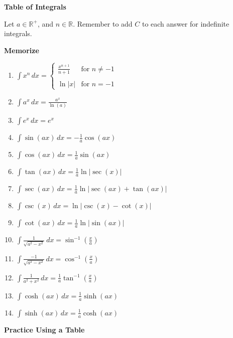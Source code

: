 \documentclass[11pt]{article}
\begin{document}
\begin{center}\textbf{\Huge Table of Integrals }\end{center}
Let $a \in \mathbb{R}^{+}$, and $n \in \mathbb{R}$. Remember to add $C$ to each answer for indefinite integrals.
\begin{center}
\textbf{\large Memorize}
\end{center}
\begin{multicols}{2}
\begin{enumerate}
\item $\displaystyle\int x^n\,dx =
\begin{cases}
\displaystyle\frac{x^{n+1}}{n+1} &\mbox{for }n\neq -1\\\\
\displaystyle \ln |x| &\mbox{for }n=-1
\end{cases}$
\item $\displaystyle\int a^x\,dx = \frac{a^x}{\ln(a)}$
\item $\displaystyle\int e^x\,dx = e^x$
\item $\displaystyle\int \sin(ax)\,dx = -\frac{1}{a} \cos(ax)$
\item $\displaystyle\int \cos(ax)\,dx = \frac{1}{a}\sin(ax)$
\item $\displaystyle\int \tan(ax)\,dx = \frac{1}{a}\ln|\sec(x)|$
\item $\displaystyle\int \sec(ax)\,dx = \frac{1}{a}\ln|\sec(ax)+\tan(ax)|$
\item $\displaystyle\int \csc(x)\,dx = \ln|\csc(x)-\cot(x)|$
\item $\displaystyle\int \cot(ax)\,dx = \frac{1}{a}\ln|\sin(ax)|$
\item $\displaystyle\int \frac{1}{\sqrt{a^2 - x^2}}\ dx = \sin^{-1}\left(\frac{x}{a}\right)$
\item $\displaystyle\int \frac{-1}{\sqrt{a^2-x^2}}\,dx = \cos^{-1}\left(\frac{x}{a}\right)$
\item $\displaystyle\int \frac{1}{a^2+x^2}\,dx = \frac{1}{a}\tan^{-1}\left(\frac{x}{a}\right)$
\item $\displaystyle\int \cosh(ax)\,dx = \frac{1}{a}\sinh(ax)$
\item $\displaystyle\int \sinh(ax)\,dx = \frac{1}{a}\cosh(ax)$
\end{enumerate}
\end{multicols}
\vspace{10mm}
\begin{center}
\textbf{\large Practice Using a Table}
\end{center}
\end{document}
